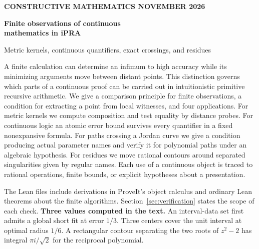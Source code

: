 \documentclass[11pt,letterpaper]{article}
\theoremstyle{definition}\newtheorem{definition}[theorem]{Definition}
\begin{document}
\thispagestyle{plain}
{\small\bfseries\color{blueink} CONSTRUCTIVE MATHEMATICS \hfill NOVEMBER 2026}\par
\vspace{14pt}
{\fontsize{26}{30}\selectfont\bfseries\color{ink}Finite observations of continuous\\[2pt] mathematics in iPRA\par}
\vspace{7pt}
{\large Metric kernels, continuous quantifiers, exact crossings, and residues\par}
\vspace{13pt}
\noindent A finite calculation can determine an infimum to high accuracy while its minimizing arguments move between distant points. This distinction governs which parts of a continuous proof can be carried out in intuitionistic primitive recursive arithmetic. We give a comparison principle for finite observations, a condition for extracting a point from local witnesses, and four applications. For metric kernels we compute composition and test equality by distance probes. For continuous logic an atomic error bound survives every quantifier in a fixed nonexpansive formula. For paths crossing a Jordan curve we give a condition producing actual parameter names and verify it for polynomial paths under an algebraic hypothesis. For residues we move rational contours around separated singularities given by regular names. Each use of a continuous object is traced to rational operations, finite bounds, or explicit hypotheses about a presentation.\par
\vspace{7pt}
\noindent The Lean files include derivations in ProveIt's object calculus and ordinary Lean theorems about the finite algorithms. Section~\ref{sec:verification} states the scope of each check.
\vspace{7pt}
\tableofcontents
\medskip
\noindent\small\textbf{Three values computed in the text.}
An interval-data set first admits a global short fit at error \(1/3\). Three centers cover the unit interval at optimal radius \(1/6\). A rectangular contour separating the two roots of \(z^2-2\) has integral \(\pi i/\sqrt{2}\) for the reciprocal polynomial.\normalsize
\clearpage






\end{document}
